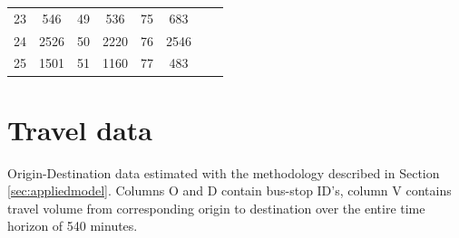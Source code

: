 \begin{center}
\begin{tabular}{|c|c||c|c||c|c||c|c|}
        23          & 546                 & 49          & 536                 & 75          & 683                 &             &                     \\
        24          & 2526                & 50          & 2220                & 76          & 2546                &             &                     \\
        25          & 1501                & 51          & 1160                & 77          & 483                 &             &                     \\
        \hline
    \end{tabular}
\end{center}

\newpage
\section{Travel data}\label{app:traveldata}
Origin-Destination data estimated with the methodology described in Section \ref{sec:appliedmodel}. Columns O and D contain bus-stop ID's, column V contains travel volume from corresponding origin to destination over the entire time horizon of 540 minutes.

